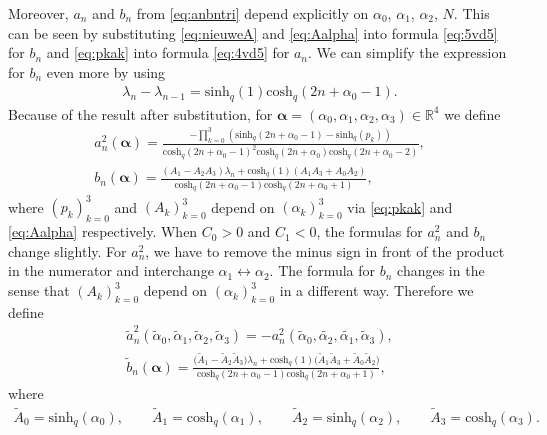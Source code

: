 \documentclass[10pt,a4paper]{amsart}
\numberwithin{equation}{section}
\newcommand{\RR}{\mathbb{R}}
\newcommand{\chq}{\mathrm{cosh}_q}
\newcommand{\shq}{\mathrm{sinh}_q}
\begin{document}
Moreover, $a_n$ and $b_n$ from \eqref{eq:anbntri} depend explicitly on $\alpha_0$, $\alpha_1$, $\alpha_2$, $N$. This can be seen by substituting \eqref{eq:nieuweA} and \eqref{eq:Aalpha} into formula \eqref{eq:5vd5} for $b_n$ and \eqref{eq:pkak} into formula \eqref{eq:4vd5} for $a_n$. We can simplify the expression for $b_n$ even more by using
\begin{gather}
	\lambda_n-\lambda_{n-1}=\shq(1)\chq(2n+\alpha_0-1).\label{eq:difference eigenvalues}
\end{gather}
Because of the result after substitution, for $\bm{\alpha}=(\alpha_0,\alpha_1,\alpha_2,\alpha_3)\in\RR^4$ we define
\begin{gather}
a_n^2(\bm{\alpha})=\frac{-\prod_{k=0}^3(\shq(2n+\alpha_0-1)-\shq(p_k))}{\chq(2n+\alpha_0-1)^2\chq(2n+\alpha_0)\chq(2n+\alpha_0-2)},\label{eq:annew}\\
b_n(\bm{\alpha})=\frac{ (A_1 -A_2A_3)\lambda_n+\chq(1) (A_1A_3+A_0A_2)}{\chq(2n+\alpha_0-1)\chq(2n+\alpha_0+1)},\label{eq:bnnew}
\end{gather}
where $(p_k)_{k=0}^3$ and $(A_k)_{k=0}^3$ depend on $(\alpha_k)_{k=0}^3$ via \eqref{eq:pkak} and \eqref{eq:Aalpha} respectively. When $C_0>0$ and $C_1<0$, the formulas for $a_n^2$ and $b_n$ change slightly. For $a_n^2$, we have to remove the minus sign in front of the product in the numerator and interchange $\alpha_1\leftrightarrow \alpha_2$. The formula for $b_n$ changes in the sense that $(A_k)_{k=0}^3$ depend on $(\alpha_k)_{k=0}^3$ in a different way. Therefore we define
\begin{gather}
	\tilde{a}_n^2(\tilde{\alpha}_0,\tilde{\alpha}_1,\tilde{\alpha}_2,\tilde{\alpha}_3) =-a_n^2(\tilde{\alpha}_0,\tilde{\alpha_2},\tilde{\alpha_1},\tilde{\alpha}_3),\label{eq:annewtilde}\\
	\tilde{b}_n(\bm{\alpha})=\frac{ \big(\tilde{A}_1 -\tilde{A}_2\tilde{A}_3\big)\lambda_n+\chq(1) \big(\tilde{A}_1\tilde{A}_3+\tilde{A}_0\tilde{A}_2\big)}{\chq(2n+\alpha_0-1)\chq(2n+\alpha_0+1)},\label{eq:bnnewtilde}
\end{gather}
where
\begin{gather*}
	\tilde{A}_0=\shq(\alpha_0),\qquad \tilde{A}_1=\chq(\alpha_1),\qquad \tilde{A}_2=\shq(\alpha_2),\qquad \tilde{A}_3=\chq(\alpha_3).\label{eq:Aalphatilde}
\end{gather*}
\end{document}

